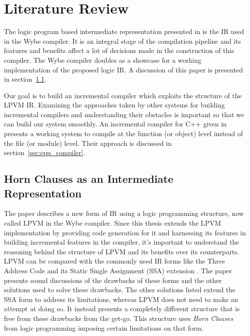 \chapter{Literature Review}
\label{chap:literature_review}


The logic program based intermediate representation presented in
\cite{lpvm2015} is the IR used in the Wybe compiler. It is an integral stage of
the compilation pipeline and its features and benefits affect a lot of
decisions made in the construction of this compiler. The Wybe compiler doubles
as a showcase for a working implementation of the proposed logic IR. A
discussion of this paper is presented in section~\ref{sec:horn_clauses}.

Our goal is to build an incremental compiler which exploits the structure of
the LPVM IR. Examining the approaches taken by other systems for building
incremental compilers and understanding their obstacles is important so that we
can build our system smoothly. An incremental compiler for C++ given in
\cite{cpp_compiler} presents a working system to compile at the function (or
object) level instead of the file (or module) level. Their approach is
discussed in section~\ref{sec:cpp_compiler}.


\section{Horn Clauses as an Intermediate Representation \citep{lpvm2015}}
\label{sec:horn_clauses}


The paper describes a new form of IR using a logic programming structure, now
called LPVM in the Wybe compiler. Since this thesis extends the LPVM
implementation by providing code generation for it and harnessing its features
in building incremental features in the compiler, it's important to understand
the reasoning behind the structure of LPVM and its benefits over its
counterparts. LPVM can be compared with the commonly used IR forms like the
Three Address Code and its Static Single Assignment (SSA) extension
\citep{alpernSSA}. The paper presents sound discussions of the drawbacks of
these forms and the other solutions used to solve these drawbacks. The other
solutions listed extend the SSA form to address its limitations, whereas LPVM
does not need to make an attempt at doing so. It instead presents a completely
different structure that is free from these drawbacks from the get-go. This
structure uses \textit{Horn Clauses} from logic programming imposing certain limitations
on that form.

